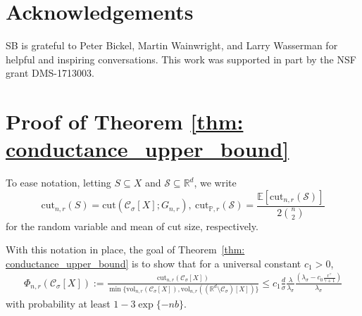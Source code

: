 \documentclass[11pt,twoside]{article}
\theoremstyle{definition}
\newcommand{\vol}{\mathrm{vol}}
\newcommand{\cut}{\mathrm{cut}}
\newcommand{\Reals}{\mathbb{R}}
\newcommand{\Rd}{\Reals^d}
\newcommand{\1}{\mathbbm{1}}
\newcommand{\Xbf}{X}
\newcommand{\Pbb}{\mathbb{P}}
\newcommand{\Sset}{\mathcal{S}}
\newcommand{\Cset}{\mathcal{C}}
\newcommand{\Csig}{\Cset_{\sigma}}
\begin{document}
\section*{Acknowledgements}

SB is grateful to Peter Bickel, Martin Wainwright, and Larry Wasserman for
helpful and inspiring conversations. This work was supported in part by the NSF grant DMS-1713003.


 

\appendix

\section{Proof of Theorem \ref{thm: conductance_upper_bound}}
\label{sec: proof_of_theorem_1}

To ease notation, letting $S \subseteq X$ and $\Sset \subseteq \Reals^d$, we write
\begin{equation*}
\cut_{n,r}(S) = \cut(\Csig[\Xbf]; G_{n,r}), ~ \cut_{\Pbb,r}(\Sset)= \frac{\mathbb{E}[\cut_{n,r}(\Sset)]}{2{n \choose 2}}
\end{equation*}
for the random variable and mean of cut size, respectively.

With this notation in place, the goal of Theorem~\ref{thm: conductance_upper_bound} is to show that for a universal constant $c_1 > 0$,
\begin{align*}
\Phi_{n,r}(\Csig[\Xbf]) := \frac{\cut_{n,r}(\Csig[\Xbf])}{\min\{\vol_{n,r}(\Csig[\Xbf]), \vol_{n,r}((\Rd \setminus \Csig)[\Xbf])\}} \leq c_1 \frac{d}{\sigma}
    \frac{\lambda}{\lambda_{\sigma}} \frac{(\lambda_{\sigma} -
      c_0\frac{r^{\gamma}}{\gamma+1})}{\lambda_{\sigma}}
\end{align*}
with probability at least $1 - 3\exp\{-nb\}$.
\end{document}
